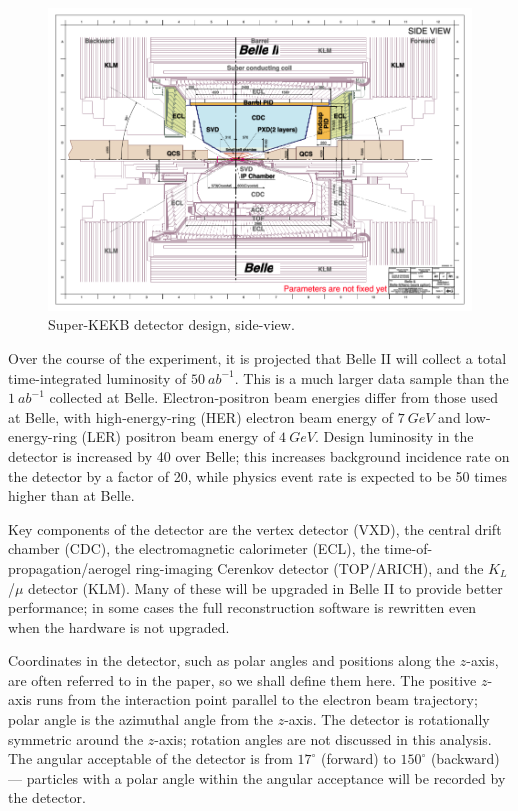 \documentclass[12pt]{thesis}  %
\begin{document}
\begin{figure}[h]
\centering
\includegraphics[width=0.8\linewidth]{images/super-kekb-side-view.png}
\caption[]%
{{\small Super-KEKB detector design, side-view.}}
\label{fig:superKEKB}
\end{figure}

Over the course of the experiment, it is projected that Belle II will collect a total time-integrated luminosity of $\SI{50}{ab^{-1}}$. This is a much larger data sample than the $\SI{1}{ab^{-1}}$ collected at Belle. Electron-positron beam energies differ from those used at Belle, with high-energy-ring (HER) electron beam energy of $\SI{7}{GeV}$ and low-energy-ring (LER) positron beam energy  of $\SI{4}{GeV}$. Design luminosity in the detector is increased by 40 over Belle; this increases background incidence rate on the detector by a factor of 20, while physics event rate is expected to be 50 times higher than at Belle.

Key components of the detector are the vertex detector (VXD), the central drift chamber (CDC), the electromagnetic calorimeter (ECL), the time-of-propagation/aerogel ring-imaging Cerenkov detector (TOP/ARICH), and the $K_L$/$\mu$ detector (KLM). Many of these will be upgraded in Belle II to provide better performance; in some cases the full reconstruction software is rewritten even when the hardware is not upgraded.

Coordinates in the detector, such as polar angles and positions along the $z$-axis, are often referred to in the paper, so we shall define them here. The positive $z$-axis runs from the interaction point parallel to the electron beam trajectory; polar angle is the azimuthal angle from the $z$-axis. The detector is rotationally symmetric around the $z$-axis; rotation angles are not discussed in this analysis. The angular acceptable of the detector is from $17^{\circ}$ (forward) to $150^{\circ}$ (backward) --- particles with a polar angle within the angular acceptance will be recorded by the detector. 
\end{document}
